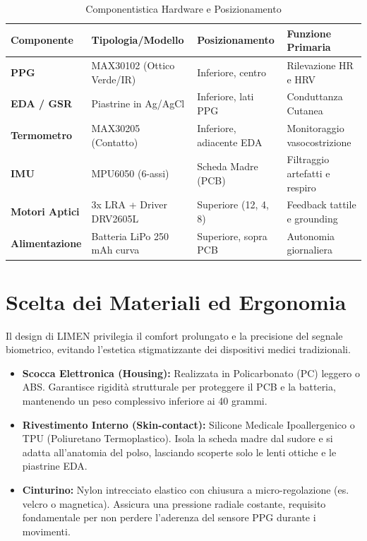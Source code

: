 \documentclass[12pt,a4paper]{article}
\begin{document}
\begin{table}[h!]
    \centering
    \small
    \caption{Componentistica Hardware e Posizionamento}
    \vspace{0.3cm}
    \begin{tabularx}{\textwidth}{@{}l l l X@{}}
        \toprule
        \textbf{Componente} & \textbf{Tipologia/Modello} & \textbf{Posizionamento} & \textbf{Funzione Primaria} \\ \midrule
        \textbf{PPG} & MAX30102 (Ottico Verde/IR) & Inferiore, centro & Rilevazione HR e HRV \\
        \textbf{EDA / GSR} & Piastrine in Ag/AgCl & Inferiore, lati PPG & Conduttanza Cutanea \\
        \textbf{Termometro} & MAX30205 (Contatto) & Inferiore, adiacente EDA & Monitoraggio vasocostrizione \\
        \textbf{IMU} & MPU6050 (6-assi) & Scheda Madre (PCB) & Filtraggio artefatti e respiro \\
        \textbf{Motori Aptici} & 3x LRA + Driver DRV2605L & Superiore (12, 4, 8) & Feedback tattile e grounding \\
        \textbf{Alimentazione} & Batteria LiPo 250 mAh curva & Superiore, sopra PCB & Autonomia giornaliera \\
        \bottomrule
    \end{tabularx}
\end{table}

\section{Scelta dei Materiali ed Ergonomia}
Il design di LIMEN privilegia il comfort prolungato e la precisione del segnale biometrico, evitando l'estetica stigmatizzante dei dispositivi medici tradizionali.

\begin{itemize}
    \item \textbf{Scocca Elettronica (Housing):} Realizzata in Policarbonato (PC) leggero o ABS. Garantisce rigidità strutturale per proteggere il PCB e la batteria, mantenendo un peso complessivo inferiore ai 40 grammi.
    \item \textbf{Rivestimento Interno (Skin-contact):} Silicone Medicale Ipoallergenico o TPU (Poliuretano Termoplastico). Isola la scheda madre dal sudore e si adatta all'anatomia del polso, lasciando scoperte solo le lenti ottiche e le piastrine EDA.
    \item \textbf{Cinturino:} Nylon intrecciato elastico con chiusura a micro-regolazione (es. velcro o magnetica). Assicura una pressione radiale costante, requisito fondamentale per non perdere l'aderenza del sensore PPG durante i movimenti.
\end{itemize}
\end{document}
